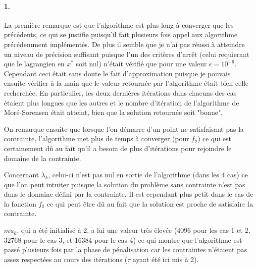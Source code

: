 \documentclass[12pt]{article}
\begin{document}
\paragraph{1.}
La première remarque est que l'algorithme est plus long à converger que les précédents, ce qui se justifie puisqu'il fait plusieurs fois appel aux algorithme précédemment implémentés. De plus il semble que je n'ai pas réussi à atteindre un niveau de précision suffisant puisque l'un des critères d'arrêt (celui requierant que le lagrangien en $x^*$ soit nul) n'était vérifié que pour une valeur $\epsilon = 10^{-6}$. Cependant ceci était sans doute le fait d'approximation puisque je pouvais ensuite vérifier à la main que le valeur retournée par l'algorithme était bien celle recherchée. En particulier, les deux dernières itérations dans chacuns des cas étaient plus longues que les autres et le nombre d'itération de l'algorithme de Moré-Sorensen était atteint, bien que la solution retournée soit "bonne".

On remarque ensuite que lorsque l'on démarre d'un point ne satisfaisant pas la contrainte, l'algorithme met plus de temps à converger (pour $f_2$) ce qui est certainement dû au fait qu'il a besoin de plus d'itérations pour rejoindre le domaine de la contrainte.

Concernant $\lambda_k$, celui-ci n'est pas nul en sortie de l'algorithme (dans les 4 cas) ce que l'on peut intuiter puisque la solution du problème sans contrainte n'est pas dans le domaine défini par la contrainte. Il est cependant plus petit dans le cas de la fonction $f_2$ ce qui peut être dû au fait que la solution est proche de satisfaire la contrainte.

$mu_k$, qui a été initialisé à 2, a lui une valeur très élevée (4096 pour les cas 1 et 2, 32768 pour le cas 3, et 16384 pour le cas 4) ce qui montre que l'algorithme est passé plusieurs fois par la phase de pénalisation car les contraintes n'étaient pas assez respectées au cours des itérations ($\tau$ ayant été ici mis à 2).
\end{document}
